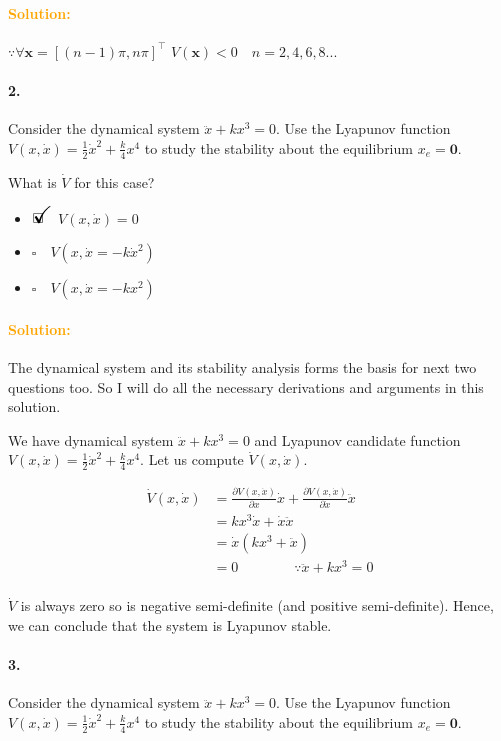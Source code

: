 \documentclass[12pt, a4paper]{article}
\newcommand{\ans}{\item[]$\rlap{\LARGE{\checkmark}}\square\quad$}
\newcommand{\noans}{\item[]$\square\quad$}
\begin{document}
\paragraph{\textcolor{orange}{Solution:}}$\because \forall\bm{x}=[(n-1)\pi,n\pi]^{\intercal}\,\,V(\bm{x})<0\quad n=2,4,6,8...$

\paragraph{2.}
Consider the dynamical system $\ddot{x}+kx^{3}=0$. Use the Lyapunov function $V(x,\dot{x})=\frac{1}{2}\dot{x}^{2} + \frac{k}{4}x^{4}$ to study the stability about the equilibrium $x_{e} = \bm{0}$. \medskip

What is $\dot{V}$ for this case?

\begin{itemize}
    \ans $V(x,\dot{x}) = 0$
    \noans $V(x,\dot{x} = -k\dot{x}^{2})$
    \noans $V(x,\dot{x} = -kx^{2})$
\end{itemize}

\paragraph{\textcolor{orange}{Solution:}}The dynamical system and its stability analysis forms the basis for next two questions too. So I will do all the necessary derivations and arguments in this solution.

We have dynamical system $\ddot{x}+kx^{3}=0$ and Lyapunov candidate function $V(x,\dot{x})=\frac{1}{2}\dot{x}^{2} + \frac{k}{4}x^{4}$. Let us compute $\dot{V}(x,\dot{x})$.

\begin{equation*}
    \begin{split}
        \dot{V}(x,\dot{x})&=\frac{\partial V(x,\dot{x})}{\partial x}\dot{x}+\frac{\partial V(x,\dot{x})}{\partial \dot{x}}\ddot{x}\\
        &=kx^{3}\dot{x}+\dot{x}\ddot{x}\\
        &=\dot{x}(kx^{3}+\ddot{x})\\
        &=0\quad\quad\quad\quad\because\ddot{x}+kx^{3}=0\\
    \end{split}
\end{equation*}

$\dot{V}$ is always zero so is negative semi-definite (and positive semi-definite). Hence, we can conclude that the system is Lyapunov stable. 

\paragraph{3.}
Consider the dynamical system $\ddot{x}+kx^{3}=0$. Use the Lyapunov function $V(x,\dot{x})=\frac{1}{2}\dot{x}^{2} + \frac{k}{4}x^{4}$ to study the stability about the equilibrium $x_{e} = \bm{0}$. \medskip
\end{document}
